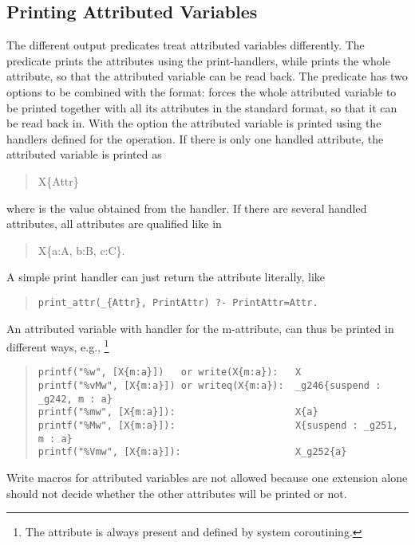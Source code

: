 \subsection{Printing Attributed Variables}
The different output predicates treat attributed variables differently.
The  predicate prints
the attributes using the print-handlers,
while  prints the whole
attribute, so that the attributed variable
can be read back.
The  predicate has two
options to be combined with
the  format:  forces the whole attributed variable to be
printed
together with all its attributes in the standard format, so that
it can be read back in.
With the  option the attributed variable is printed using the
handlers
defined for the  operation.
If there is only one handled attribute, the attributed variable is printed as
\begin{quote}
X\{Attr\}
\end{quote}
where  is the value obtained from the handler.
If there are several handled attributes, all attributes are qualified
like in
\begin{quote}
X\{a:A, b:B, c:C\}.
\end{quote}
A simple print handler can just return the attribute literally, like
\begin{quote}\begin{verbatim}
print_attr(_{Attr}, PrintAttr) ?- PrintAttr=Attr.
\end{verbatim}\end{quote}
{\samepage
An attributed variable  with  handler
for the m-attribute, can thus be printed in different ways, e.g.,
\footnote{The attribute  is always present and defined
by system coroutining.}
\begin{quote}
\begin{verbatim}
printf("%w", [X{m:a}])   or write(X{m:a}):   X
printf("%vMw", [X{m:a}]) or writeq(X{m:a}):  _g246{suspend : _g242, m : a}
printf("%mw", [X{m:a}]):                     X{a}
printf("%Mw", [X{m:a}]):                     X{suspend : _g251, m : a}
printf("%Vmw", [X{m:a}]):                    X_g252{a}
\end{verbatim}
\end{quote}
}

Write macros for attributed variables are not allowed because one extension
alone
should not decide whether the other attributes will be printed or not.

